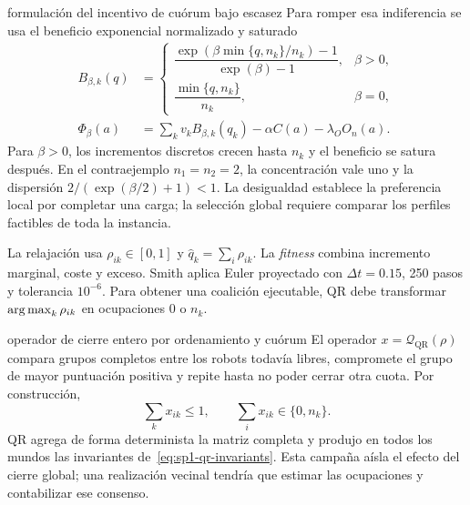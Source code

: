\iffalse
\begin{contribucion}{formulación del incentivo de cuórum bajo escasez}
Para romper esa indiferencia se usa el beneficio exponencial normalizado y saturado
\begin{equation}
 \begin{aligned}
 B_{\beta,k}(q)&=
 \begin{cases}
 \dfrac{\exp\!\left(\beta\min\{q,n_k\}/n_k\right)-1}{\exp(\beta)-1},&\beta>0,\\[4pt]
 \dfrac{\min\{q,n_k\}}{n_k},&\beta=0,
 \end{cases}\\[4pt]
 \Phi_\beta(a)&=\sum_kv_kB_{\beta,k}(q_k)-\alpha C(a)-\lambda_OO_n(a).
 \end{aligned}
 \label{eq:sp1-quorum-benefit}
\end{equation}
Para \(\beta>0\), los incrementos discretos crecen hasta \(n_k\) y el beneficio se satura después. En el contraejemplo \(n_1=n_2=2\), la concentración vale uno y la dispersión \(2/(\exp(\beta/2)+1)<1\). La desigualdad establece la preferencia local por completar una carga; la selección global requiere comparar los perfiles factibles de toda la instancia.
\end{contribucion}

La relajación usa \(\rho_{ik}\in[0,1]\) y \(\widehat q_k=\sum_i\rho_{ik}\). La \emph{fitness} combina incremento marginal, coste y exceso. Smith aplica Euler proyectado con \(\Delta t=0.15\), 250 pasos y tolerancia \(10^{-6}\). Para obtener una coalición ejecutable, QR debe transformar \(\operatorname*{arg\,max}_k\rho_{ik}\) en ocupaciones \(0\) o \(n_k\).

\begin{contribucion}{operador de cierre entero por ordenamiento y cuórum}
El operador $x=\mathcal Q_{\mathrm{QR}}(\rho)$ compara grupos completos entre los robots todavía libres, compromete el grupo de mayor puntuación positiva y repite hasta no poder cerrar otra cuota. Por construcción,
\begin{equation}
 \sum_kx_{ik}\leq1,\qquad \sum_ix_{ik}\in\{0,n_k\}.
 \label{eq:sp1-qr-invariants}
\end{equation}
QR agrega de forma determinista la matriz completa y produjo en todos los mundos las invariantes de~\eqref{eq:sp1-qr-invariants}. Esta campaña aísla el efecto del cierre global; una realización vecinal tendría que estimar las ocupaciones y contabilizar ese consenso.
\end{contribucion}


